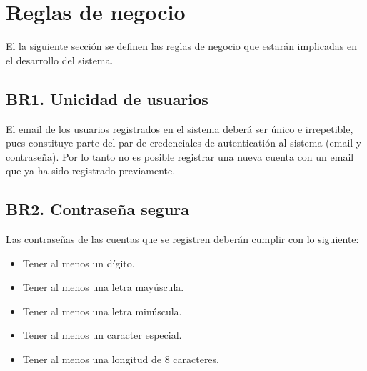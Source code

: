 
\newpage
\section{Reglas de negocio}
El la siguiente sección se definen las reglas de negocio que estarán implicadas en el desarrollo del sistema.\par
\subsection{BR1. Unicidad de usuarios}
El email de los usuarios registrados en el sistema deberá ser único e irrepetible, pues constituye parte del par de credenciales de autenticatión al sistema (email y contraseña). Por lo tanto no es posible registrar una nueva cuenta con un email que ya ha sido registrado previamente.

\subsection{BR2. Contraseña segura}
Las contraseñas de las cuentas que se registren deberán cumplir con lo siguiente:
\begin{itemize}
	\item Tener al menos un dígito.
	\item Tener al menos una letra mayúscula.
	\item Tener al menos una letra minúscula.
	\item Tener al menos un caracter especial.
	\item Tener al menos una longitud de 8 caracteres.
\end{itemize}

